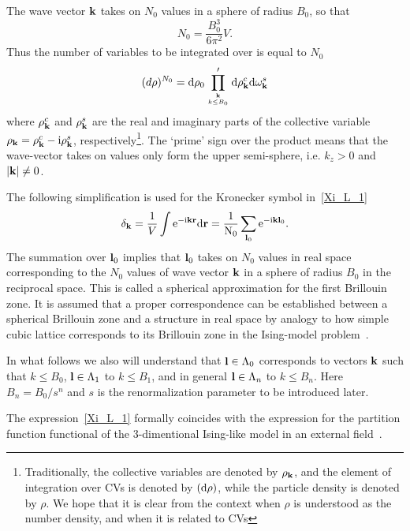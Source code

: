 The wave vector $\vb k$ takes on $N_0$ values in a sphere of radius $B_0$, so that
\begin{equation}
	\label{def:NB}
	N_0 = \frac{B_0^3}{6\pi^2}V.
\end{equation}
Thus the number of variables to be integrated over is equal to $N_0$
\begin{equation*}
	(d\rho)^{N_0} = {\rm d}\rho_0 \prod_{\vb k\atop k\le B_0}' {\rm d}\rho_{\vb k}^c {\rm d}\omega_{\vb k}^s
\end{equation*}
where $\rho_{\vb k}^c$ and $\rho_{\vb k}^s$ are the real and imaginary parts of the collective variable $\rho_{\vb k} = \rho_{\vb k}^c - {\rm i} \rho_{\vb k}^s$, respectively\footnote{Traditionally, the collective variables are denoted by $\rho_{\vb k}$, and the element of integration over CVs is denoted by $({\rm d} \rho)$, while the particle density is denoted by $\rho$. We hope that it is clear from the context when $\rho$ is understood as the number density, and when it is related to CVs}. The `prime' sign over the product means that the wave-vector takes on values only form the upper semi-sphere, i.e. $k_z > 0$ and $\abs{\vb k} \neq 0$.

The following simplification is used for the Kronecker symbol in~\eqref{Xi_L_1}
\begin{equation*}
	\delta_{\vb k} = \frac{1}{V} \int \rm{e}^{-{\rm i} \vb k \vb r} \rm{d} \vb r = \frac{1}{N_0}\sum_{\vb l_0} {\rm e}^{-{\rm i} \vb k \vb l_0}.
\end{equation*}
The summation over $\vb l_0$ implies that $\vb l_0$ takes on $N_0$ values in real space corresponding to the $N_0$ values of wave vector $\vb k$ in a sphere of radius $B_0$ in the reciprocal space. This is called a spherical approximation for the first Brillouin zone. It is assumed that a proper correspondence can be established between a spherical Brillouin zone and a structure in real space by analogy to how simple cubic lattice corresponds to its Brillouin zone in the Ising-model problem~\cite{Yukh2001book}. 

In what follows we also will understand that $\vb l \in \Lambda_0$ corresponds to vectors $\vb k$ such that $k \leq B_0$, $\vb l \in \Lambda_1$ to $k \leq B_1$, and in general $\vb l \in \Lambda_n$ to $k \leq B_n$. Here $B_n = B_0/s^n$ and $s$ is the renormalization parameter to be introduced later.

The expression~\eqref{Xi_L_1} formally coincides with the expression for the partition function functional of the 3-dimentional Ising-like model in an external field~\cite{Mpk2012book,MpkRoma2012}. 

